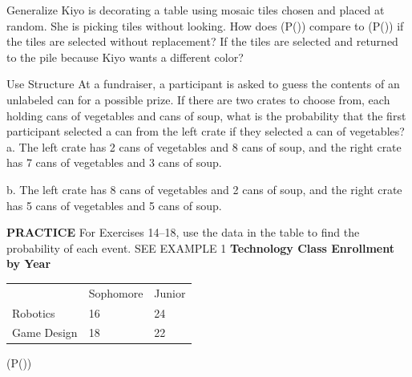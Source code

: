 \documentclass{article}
\newenvironment{practice}[2]{}{}        %
\newcommand{\answer}[1]{}               %
\newcommand{\placeholder}[2]{}          %
\begin{document}
\begin{practice}{12}{2}
Generalize Kiyo is decorating a table using mosaic tiles chosen and placed at random. She is picking tiles without looking. How does (P(\mid{})) compare to (P(\mid{})) if the tiles are selected without replacement? If the tiles are selected and returned to the pile because Kiyo wants a different color?
\placeholder{illustration}{Round wooden table with fifteen colored mosaic tiles: six blue B, four green G, three yellow Y and two orange-red R.}
\answer{Without replacement: (P(\text{yellow second}\mid\text{blue first})=\frac3{14}), which is greater than (P(\text{yellow second}\mid\text{yellow first})=\frac2{14}=\frac17); With replacement: (P(\text{yellow second}\mid\text{blue first})=P(\text{yellow second}\mid\text{yellow first})=\frac3{15}=\frac15).}
\end{practice}
\begin{practice}{13}{2}
Use Structure At a fundraiser, a participant is asked to guess the contents of an unlabeled can for a possible prize. If there are two crates to choose from, each holding cans of vegetables and cans of soup, what is the probability that the first participant selected a can from the left crate if they selected a can of vegetables?
a. The left crate has 2 cans of vegetables and 8 cans of soup, and the right crate has 7 cans of vegetables and 3 cans of soup.
\answer{a. (\frac29); (P(\text{left crate}\mid\text{vegetable})=\frac{P(\text{left crate and vegetable})}{P(\text{vegetable})}=\frac{\frac2{20}}{\frac9{20}}=\frac29)}
b. The left crate has 8 cans of vegetables and 2 cans of soup, and the right crate has 5 cans of vegetables and 5 cans of soup.
\answer{b. (\frac8{13}); (P(\text{left crate}\mid\text{vegetable})=\frac{P(\text{left crate and vegetable})}{P(\text{vegetable})}=\frac{\frac8{20}}{\frac{13}{20}}=\frac8{13})}
\end{practice}
\begin{practice}{14}{1}
\textbf{PRACTICE}
For Exercises 14--18, use the data in the table to find the probability of each event. SEE EXAMPLE 1
\textbf{Technology Class Enrollment by Year}
\begin{tabular}{lll}
 & Sophomore & Junior \\
Robotics & 16 & 24 \\
Game Design & 18 & 22 \\
\end{tabular}
(P(\mid{}))
\answer{0.6 or 60\%}
\end{practice}
\end{document}

